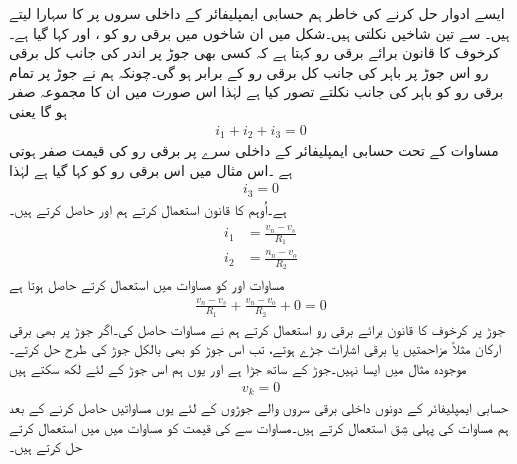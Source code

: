 ایسے  ادوار حل کرنے کی خاطر ہم حسابی ایمپلیفائر کے داخلی سروں پر   کا سہارا لیتے ہیں۔   سے تین شاخیں نکلتی ہیں۔شکل میں ان شاخوں میں برقی رو کو  ،  اور  کہا گیا ہے۔کرخوف کا قانون برائے برقی رو  کہتا ہے کہ کسی بھی جوڑ پر اندر کی جانب کل برقی رو اس جوڑ پر باہر کی جانب کل برقی رو کے برابر ہو گی۔چونکہ ہم نے جوڑ پر تمام برقی رو کو باہر کی جانب نکلتے تصور کیا ہے لہٰذا اس صورت میں ان کا مجموعہ صفر ہو گا یعنی
\begin{align} \label{مساوات_منفی_منفی_مداخل_کے_جوڑ_پر_رو}
i_1+i_2+i_3 = 0
\end{align}
مساوات   کے تحت حسابی ایمپلیفائر کے داخلی سرے پر برقی رو کی قیمت صفر ہوتی ہے ۔اس مثال میں اس برقی رو کو  کہا گیا ہے لہٰذا
\begin{align} \label{مساوات_حسابی_منفی_سرے_پر_صفر_رو}
i_3=0
\end{align}
ہے۔اُوہم کا قانون استعمال کرتے ہم  اور  حاصل کرتے ہیں۔
\begin{gather} 
\begin{aligned}\label{مساوات_منفی_بقایا_داخلی_رو}
i_1& =\frac{v_n-v_s}{R_1}\\
i_2 &=\frac{n_n-v_o}{R_2}
\end{aligned}
\end{gather}
مساوات   اور   کو مساوات   میں استعمال کرتے حاصل ہوتا ہے
\begin{align} \label{مساوات_منفی_کا_حصول}
\frac{v_n - v_s}{R_1}+\frac{v_n-v_o}{R_2}+0=0
\end{align}
	جوڑ  پر کرخوف کا قانون برائے برقی رو استعمال کرتے ہم نے مساوات   حاصل کی۔اگر جوڑ  پر بھی برقی ارکان مثلاً مزاحمتیں یا برقی اشارات جڑے ہوتے، تب اس جوڑ کو بھی بالکل جوڑ  کی طرح حل کرتے۔موجودہ مثال میں ایسا نہیں۔جوڑ   کے ساتھ جڑا ہے اور یوں ہم اس جوڑ کے لئے لکھ سکتے ہیں
\begin{align} \label{مساوات_منفی_مثبت__زمین_پر}
v_k=0
\end{align}
	حسابی ایمپلیفائر کے دونوں داخلی برقی سروں والے جوڑوں کے لئے یوں مساواتیں حاصل کرنے کے بعد ہم مساوات   کی پہلی شِق استعمال کرتے ہیں۔مساوات   سے  کی قیمت کو مساوات   میں  میں استعمال کرتے حل کرتے ہیں۔
